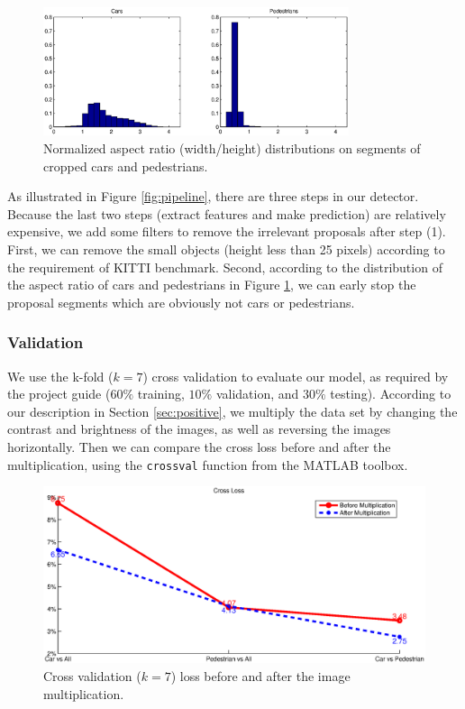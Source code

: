 \documentclass{article} %
\begin{document}
\begin{figure}[htb]
\begin{center}
\includegraphics[width=0.8\textwidth]{aspect_ratio.eps}
\end{center}
\caption{Normalized aspect ratio (width/height) distributions on segments of cropped cars and pedestrians.
\label{fig:aspect_ratio}}
\end{figure}

As illustrated in Figure \ref{fig:pipeline}, there are three steps in our detector. Because the last two steps (extract features and make prediction) are relatively expensive, we add some filters to remove the irrelevant proposals after step (1). First, we can remove the small objects (height less than 25 pixels) according to the requirement of KITTI benchmark. Second, according to the distribution of the aspect ratio of cars and pedestrians in Figure \ref{fig:aspect_ratio}, we can early stop the proposal segments which are obviously not cars or pedestrians.

\subsubsection{Validation}

We use the k-fold ($k=7$) cross validation to evaluate our model, as required by the project guide ($60\%$ training, $10\%$ validation, and $30\%$ testing). According to our description in Section \ref{sec:positive}, we multiply the data set by changing the contrast and brightness of the images, as well as reversing the images horizontally. Then we can compare the cross loss before and after the multiplication, using the \texttt{crossval} function from the MATLAB toolbox.


\begin{figure}[htb]
\begin{center}
\includegraphics[width=.7\textwidth]{crossloss.eps}
\end{center}
\caption{Cross validation ($k=7$) loss before and after the image multiplication.
\label{fig:crossloss}}
\end{figure}
\end{document}
